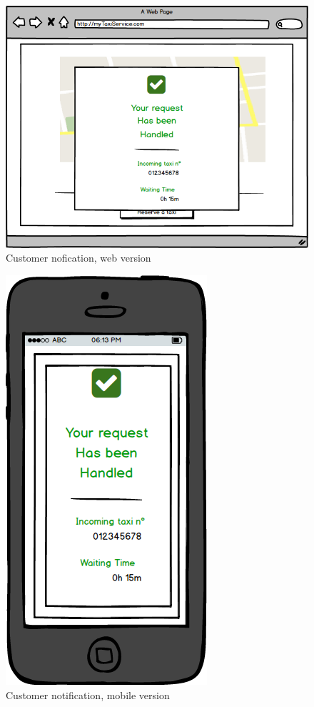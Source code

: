 \documentclass{report}
\begin{document}
				\begin{figure}[H]
					\centering
					\includegraphics[scale=0.5]{IMG/UserInterfaces/customerNotification.png}
					\caption{Customer nofication, web version}\label{requestHandlded_w}
				\end{figure}
				\begin{figure}[H]
					\centering
					\includegraphics[scale=0.4]{IMG/UserInterfaces/customerNotification_m.png}
					\caption{Customer notification, mobile version}\label{requestHandled_m}
				\end{figure}
			
\end{document}
